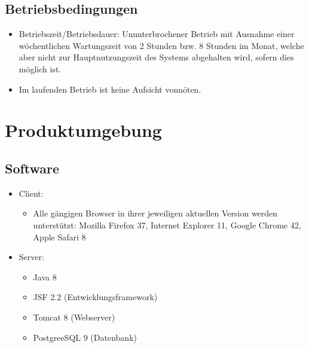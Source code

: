 \documentclass[a4paper]{scrreprt}
\begin{document}
    
	\section{Betriebsbedingungen}
	       \begin{itemize}
		       	\item Betriebszeit/Betriebsdauer: Ununterbrochener Betrieb mit Ausnahme einer wöchentlichen Wartungszeit von 2 Stunden bzw. 8 Stunden im Monat, welche aber nicht zur Hauptnutzungszeit des Systems abgehalten wird, sofern dies möglich ist.
		       	\item  Im laufenden Betrieb ist keine Aufsicht vonnöten.
	       \end{itemize}
	
			
 
\chapter{Produktumgebung}
	\section{Software}
        \begin{itemize}
      		\item \gls{Client}:
	      		\begin{itemize}
	      			\item Alle gängigen Browser in ihrer jeweiligen aktuellen Version  werden unterstützt: Mozilla Firefox 37, Internet Explorer 11, Google Chrome 42, Apple Safari 8
	      		\end{itemize}
          	\item \gls{Server}:
	            \begin{itemize}
	            	\item Java 8
	            	\item \gls{JSF} 2.2 (Entwicklungsframework)
	            	\item \gls{Tomcat} 8 (Webserver)
	            	\item \gls{PostgreeSQL} 9 (Datenbank)
	            \end{itemize}
        \end{itemize}
        
\end{document}
